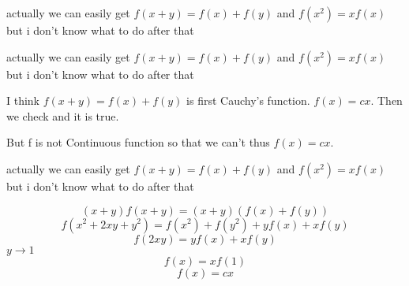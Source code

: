 \begin{solution}
	actually we can easily get $f(x+y)=f(x)+f(y)$ and $f(x^2)=xf(x)$ but i don't know what to do after that

\end{solution}



\begin{solution}
	\begin{tcolorbox}actually we can easily get $f(x+y)=f(x)+f(y)$ and $f(x^2)=xf(x)$ but i don't know what to do after that\end{tcolorbox}

I think $f(x+y)=f(x)+f(y)$ is first Cauchy's function. $f(x)=cx$. Then we check and it is true.
\end{solution}



\begin{solution}
	But f is not Continuous function so that we can't thus  $f(x)=cx$.
\end{solution}



\begin{solution}
	\begin{tcolorbox}actually we can easily get $f(x+y)=f(x)+f(y)$ and $f(x^2)=xf(x)$ but i don't know what to do after that\end{tcolorbox}

$$(x+y)f(x+y)=(x+y)(f(x)+f(y))$$
$$f(x^2+2xy+y^2)=f(x^2)+f(y^2)+yf(x)+xf(y)$$
$$f(2xy)=yf(x)+xf(y)$$
$y\rightarrow 1$
$$f(x)=xf(1)$$
$$\boxed{f(x)=cx}$$
\end{solution}






